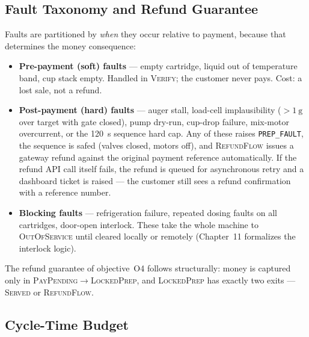 \subsection{Fault Taxonomy and Refund Guarantee}
\label{sec:faults}

Faults are partitioned by \emph{when} they occur relative to payment,
because that determines the money consequence:

\begin{itemize}[itemsep=2pt]
  \item \textbf{Pre-payment (soft) faults} --- empty cartridge, liquid out
        of temperature band, cup stack empty. Handled in \textsc{Verify};
        the customer never pays. Cost: a lost sale, not a refund.
  \item \textbf{Post-payment (hard) faults} --- auger stall, load-cell
        implausibility ($>\SI{1}{\gram}$ over target with gate closed),
        pump dry-run, cup-drop failure, mix-motor overcurrent, or the
        \SI{120}{\second} sequence hard cap. Any of these raises
        \texttt{PREP\_FAULT}, the sequence is safed (valves closed, motors
        off), and \textsc{RefundFlow} issues a gateway refund against the
        original payment reference automatically. If the refund API call
        itself fails, the refund is queued for asynchronous retry and a
        dashboard ticket is raised --- the customer still sees a refund
        confirmation with a reference number.
  \item \textbf{Blocking faults} --- refrigeration failure, repeated dosing
        faults on all cartridges, door-open interlock. These take the whole
        machine to \textsc{OutOfService} until cleared locally or remotely
        (Chapter~11 formalizes the interlock logic).
\end{itemize}

The refund guarantee of objective~O4 follows structurally: money is captured
only in \textsc{PayPending}$\rightarrow$\textsc{LockedPrep}, and
\textsc{LockedPrep} has exactly two exits --- \textsc{Served} or
\textsc{RefundFlow}.

\subsection{Cycle-Time Budget}
\label{sec:timing}

